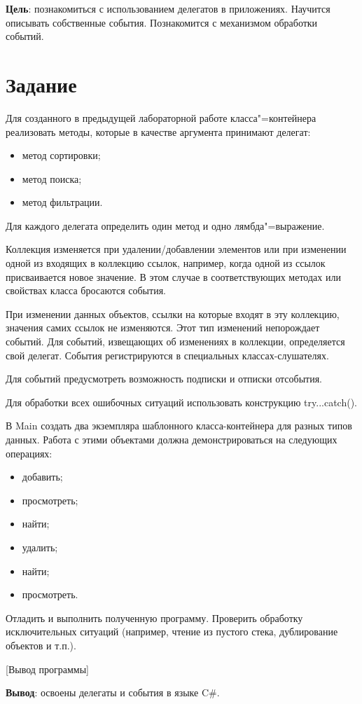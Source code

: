\documentclass{bsuir}
\newcommand{\csharp}{C{\liberationrm\#}}
\begin{document}
\maketitle
\mainmatter
\renewcommand{\thefigure}{\arabic{figure}}
\renewcommand{\thelisting}{\arabic{listing}}

\textbf{Цель}: познакомиться с использованием делегатов в приложениях. Научится
описывать собственные события. Познакомится с механизмом обработки событий.

\section*{Задание}

Для созданного в предыдущей лабораторной работе класса"=контейнера реализовать
методы, которые в качестве аргумента принимают делегат:

\begin{itemize}
    \item метод сортировки;
    \item метод поиска;
    \item метод фильтрации.
\end{itemize}

Для каждого делегата определить один метод и одно лямбда"=выражение.

Коллекция изменяется при удалении/добавлении элементов или при изменении одной
из входящих в коллекцию ссылок, например, когда одной из ссылок присваивается
новое значение. В этом случае в соответствующих методах или свойствах класса
бросаются события.

При изменении данных объектов, ссылки на которые входят в эту коллекцию,
значения самих ссылок не изменяются. Этот тип изменений непорождает событий. Для
событий, извещающих об изменениях в коллекции, определяется свой делегат.
События регистрируются в специальных классах-слушателях.

Для событий предусмотреть возможность подписки и отписки отсобытия.

Для обработки всех ошибочных ситуаций использовать конструкцию try...catch().

В Main создать два экземпляра шаблонного класса-контейнера для разных типов
данных. Работа с этими объектами должна демонстрироваться на следующих
операциях:

\begin{itemize}
    \item добавить;
    \item просмотреть;
    \item найти;
    \item удалить;
    \item найти;
    \item просмотреть.
\end{itemize}

Отладить и выполнить полученную программу. Проверить обработку исключительных
ситуаций (например, чтение из пустого стека, дублирование объектов и т.п.).


[Вывод программы]

\textbf{Вывод}: освоены делегаты и события в языке \csharp.
\end{document}
